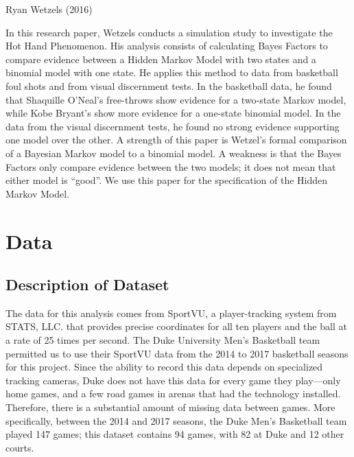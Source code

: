 \documentclass[12pt,twoside]{dukestatscithesis}
\theoremstyle{definition}
\theoremstyle{definition}
\theoremstyle{definition}
\theoremstyle{remark}
\begin{document}
Ryan Wetzels (2016)

In this research paper, Wetzels conducts a simulation study to
investigate the Hot Hand Phenomenon. His analysis consists of
calculating Bayes Factors to compare evidence between a Hidden Markov
Model with two states and a binomial model with one state. He applies
this method to data from basketball foul shots and from visual
discernment tests. In the basketball data, he found that Shaquille
O'Neal's free-throws show evidence for a two-state Markov model, while
Kobe Bryant's show more evidence for a one-state binomial model. In the
data from the visual discernment tests, he found no strong evidence
supporting one model over the other. A strength of this paper is
Wetzel's formal comparison of a Bayesian Markov model to a binomial
model. A weakness is that the Bayes Factors only compare evidence
between the two models; it does not mean that either model is ``good''.
We use this paper for the specification of the Hidden Markov Model.

\chapter{Data}\label{data}

\section{Description of Dataset}\label{description-of-dataset}

The data for this analysis comes from SportVU, a player-tracking system
from STATS, LLC. that provides precise coordinates for all ten players
and the ball at a rate of 25 times per second. The Duke University Men's
Basketball team permitted us to use their SportVU data from the 2014 to
2017 basketball seasons for this project. Since the ability to record
this data depends on specialized tracking cameras, Duke does not have
this data for every game they play---only home games, and a few road
games in arenas that had the technology installed. Therefore, there is a
substantial amount of missing data between games. More specifically,
between the 2014 and 2017 seasons, the Duke Men's Basketball team played
147 games; this dataset contains 94 games, with 82 at Duke and 12 other
courts.
\end{document}
